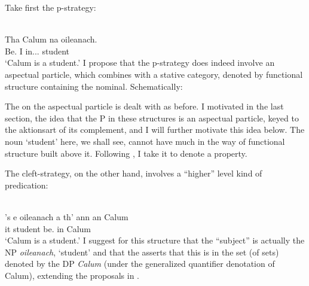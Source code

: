 \documentclass[output=paper]{langsci/langscibook}
\begin{document}
Take first the p-strategy:

\ea {}\\
\gll Tha  Calum  na  oileanach.\\
Be.\Prs{}  I  in.\Poss.\Tsg.\M{}  student \\
\glt \enquote*{Calum is a student.}
\z
I propose that the p-strategy does indeed involve an aspectual particle, which
combines with a  stative category, denoted by functional structure containing
the nominal. Schematically:

\ea
{}

\z
The   on the aspectual particle is dealt with as before. I motivated
in the last section, the idea that the P in these structures is an aspectual
particle, keyed to the aktionsart of its complement, and I will further
motivate this idea below. The noun `student' here, we shall see, cannot have
much in the way of functional structure built above it. Following
\citet{adger-ramchand:03}, I take it to denote a property.

The cleft-strategy, on the other hand, involves a ``higher'' level kind of
predication:

\ea {}\\
\gll 's e oileanach a th' {ann an} Calum\\
\Cop{} it student \Rel{} be.\Prs{} in Calum\\
\glt \enquote*{Calum is a student.}
\z
I suggest for this structure that the ``subject'' is actually the NP
\emph{oileanach}, `student' and that the  asserts that this is in
the set (of sets) denoted by the DP \emph{Calum} (under the generalized
quantifier denotation of Calum), extending the proposals in
\citet{Adger2011b}.
\end{document}
